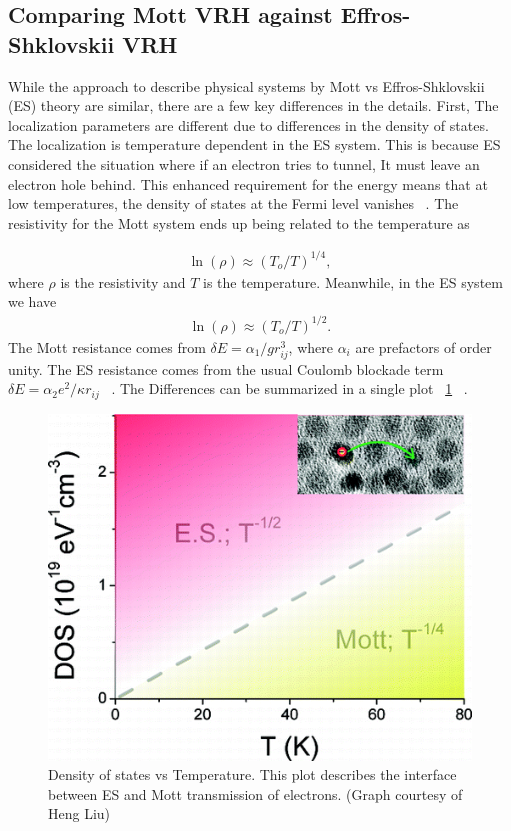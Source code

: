 \subsection{Comparing Mott VRH against Effros-Shklovskii VRH}
While the approach to describe physical systems by Mott vs Effros-Shklovskii (ES) theory are similar, there are a few key differences in the details. First, The localization parameters are different due to differences in the density of states. The localization is temperature dependent in the ES system. This is because ES considered the situation where if an electron tries to tunnel, It must leave an electron hole behind. This enhanced requirement for the energy means that at low temperatures, the density of states at the Fermi level vanishes ~\cite{joung}. The resistivity for the Mott system ends up being related to the temperature as

\begin{eqnarray}
\ln(\rho) \approx (T_o / T)^{1/4} ,
\label{fourth}
\end{eqnarray}
where $\rho$ is the resistivity and $T$ is the temperature. Meanwhile, in the ES system we have
\begin{eqnarray}
\ln(\rho) \approx (T_o / T)^{1/2}.
\label{half}
\end{eqnarray}
The Mott resistance comes from $\delta E = \alpha_1 / g r_{ij}^3 $, where $\alpha_i$ are prefactors of order unity. The ES resistance comes from the usual Coulomb blockade term $\delta E = \alpha_2 e^2 / \kappa r_{ij}$ ~\cite{aharony92}. The Differences can be summarized in a single plot ~\ref{MvsES} ~\cite{Liu10}.

\begin{figure}[htbp]
\begin{center}
\includegraphics[scale=.50]{MottvsES.png}
\caption{Density of states vs Temperature. This plot describes the interface between ES and Mott transmission of electrons. (Graph courtesy of Heng Liu)}
\label{MvsES}
\end{center}
\end{figure}


